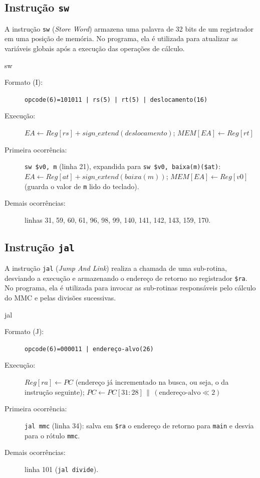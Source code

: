 \subsection{Instrução \texttt{sw}}

A instrução \texttt{sw} (\textit{Store Word}) armazena uma palavra de 32 bits
de um registrador em uma posição de memória. No programa, ela é utilizada
para atualizar as variáveis globais após a execução das operações de cálculo.

\begin{instrucao}{sw}
\begin{description}
\item[Formato (I):] \texttt{opcode(6)=101011 | rs(5) | rt(5) | deslocamento(16)}
\item[Execução:] $EA \leftarrow Reg[rs] + sign\_extend(deslocamento)$;
$MEM[EA] \leftarrow Reg[rt]$
\item[Primeira ocorrência:] \texttt{sw \$v0, m} (linha 21), expandida
para \texttt{sw \$v0, baixa(m)(\$at)}:
$EA \leftarrow Reg[at] + sign\_extend(baixa(m))$;
$MEM[EA] \leftarrow Reg[v0]$
(guarda o valor de \texttt{m} lido do teclado).
\item[Demais ocorrências:] linhas 31, 59, 60, 61, 96, 98, 99, 140, 141,
142, 143, 159, 170.
\end{description}
\end{instrucao}

\subsection{Instrução \texttt{jal}}

A instrução \texttt{jal} (\textit{Jump And Link}) realiza a chamada de uma
sub-rotina, desviando a execução e armazenando o endereço de retorno no
registrador \texttt{\$ra}. No programa, ela é utilizada para invocar as
sub-rotinas responsáveis pelo cálculo do MMC e pelas divisões sucessivas.

\begin{instrucao}{jal}
\begin{description}
\item[Formato (J):] \texttt{opcode(6)=000011 | endereço-alvo(26)}
\item[Execução:] $Reg[ra] \leftarrow PC$
(endereço já incrementado na busca, ou seja, o da instrução seguinte);
$PC \leftarrow PC[31{:}28] \,\|\, (\text{endereço-alvo} \ll 2)$
\item[Primeira ocorrência:] \texttt{jal mmc} (linha 34): salva em
\texttt{\$ra} o endereço de retorno para \texttt{main} e desvia para o
rótulo \texttt{mmc}.
\item[Demais ocorrências:] linha 101 (\texttt{jal divide}).
\end{description}
\end{instrucao}

